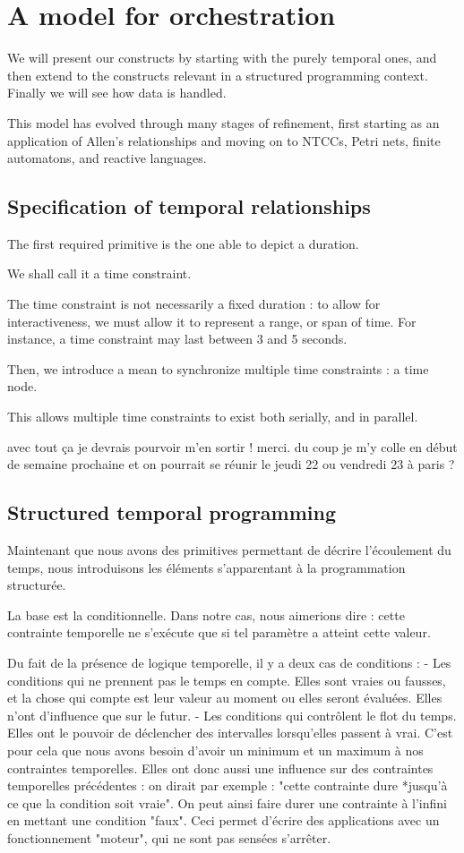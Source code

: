 \documentclass{sigchi}
\begin{document}
\section{A model for orchestration}
We will present our constructs by starting with the purely temporal ones, 
and then extend to the constructs relevant in a structured programming context.
Finally we will see how data is handled.

This model has evolved through many stages of refinement, first starting as an application of 
Allen's relationships and moving on to NTCCs, Petri nets, finite automatons, and reactive languages.

\subsection{Specification of temporal relationships}\label{sec.temporal}
The first required primitive is the one able to depict a duration.

We shall call it a time constraint.

The time constraint is not necessarily a fixed duration : to allow for interactiveness, 
we must allow it to represent a range, or span of time. For instance, a time constraint may last between 3 and 5 seconds.

Then, we introduce a mean to synchronize multiple time constraints : a time node. 

This allows multiple time constraints to exist both serially, and in parallel. 

avec tout ça je devrais pourvoir m’en sortir ! merci.
du coup je m’y colle en début de semaine prochaine et on pourrait se réunir le jeudi 22 ou vendredi 23 à paris ?


\subsection{Structured temporal programming}
Maintenant que nous avons des primitives permettant de décrire l'écoulement du temps, nous introduisons les éléments s'apparentant à la programmation structurée.

La base est la conditionnelle. Dans notre cas, nous aimerions dire : cette contrainte temporelle ne s'exécute que si tel paramètre a atteint cette valeur.

Du fait de la présence de logique temporelle, il y a deux cas de conditions : 
- Les conditions qui ne prennent pas le temps en compte. Elles sont vraies ou fausses, et la chose qui compte est leur valeur au moment ou elles seront évaluées. Elles n'ont d'influence que sur le futur.
- Les conditions qui contrôlent le flot du temps. Elles ont le pouvoir de déclencher des intervalles lorsqu'elles passent à vrai. C'est pour cela que nous avons besoin d'avoir un minimum et un maximum à nos contraintes temporelles. Elles ont donc aussi une influence sur des contraintes temporelles précédentes : on dirait par exemple : "cette contrainte dure *jusqu'à ce que la condition soit vraie". On peut ainsi faire durer une contrainte à l'infini en mettant une condition "faux". Ceci permet d'écrire des applications avec un fonctionnement "moteur", qui ne sont pas sensées s'arrêter.
\end{document}
